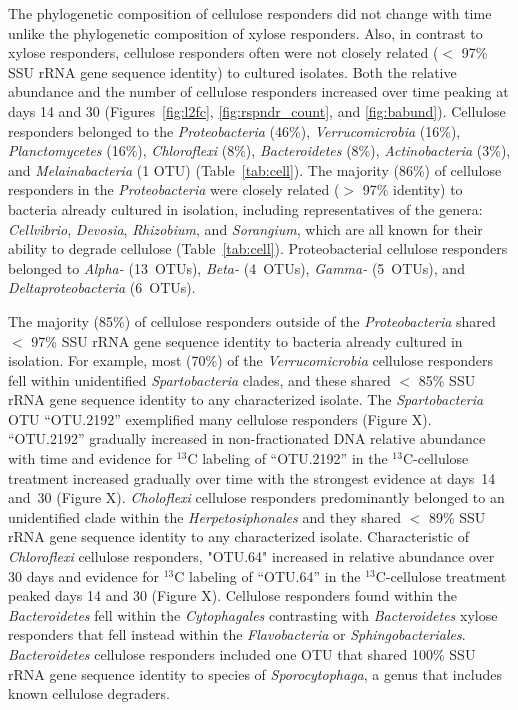 The phylogenetic composition of cellulose responders did not change with time
unlike the phylogenetic composition of xylose responders. Also, in contrast to
xylose responders, cellulose responders often were not closely related ($<$
97\% SSU rRNA gene sequence identity) to cultured isolates. Both the relative
abundance and the number of cellulose responders increased over time peaking at
days 14 and 30 (Figures~\ref{fig:l2fc}, \ref{fig:rspndr_count}, and
\ref{fig:babund}). Cellulose responders belonged to the \textit{Proteobacteria}
(46\%), \textit{Verrucomicrobia} (16\%), \textit{Planctomycetes} (16\%),
\textit{Chloroflexi} (8\%), \textit{Bacteroidetes} (8\%),
\textit{Actinobacteria} (3\%), and \textit{Melainabacteria} (1 OTU)
(Table~\ref{tab:cell}). The majority (86\%) of cellulose responders in the
\textit{Proteobacteria} were closely related ($>$ 97\% identity) to bacteria
already cultured in isolation, including representatives of the genera:
\textit{Cellvibrio}, \textit{Devosia}, \textit{Rhizobium}, and
\textit{Sorangium}, which are all known for their ability to degrade cellulose
(Table~\ref{tab:cell}). Proteobacterial cellulose responders belonged to
\textit{Alpha-} (13~OTUs), \textit{Beta-} (4~OTUs), \textit{Gamma-} (5~OTUs),
and \textit{Deltaproteobacteria} (6~OTUs). 

The majority (85\%) of cellulose responders outside of the
\textit{Proteobacteria} shared  $<$ 97\% SSU rRNA gene sequence identity to
bacteria already cultured in isolation. For example, most (70\%) of the
\textit{Verrucomicrobia} cellulose responders fell within unidentified
\textit{Spartobacteria} clades, and these shared $<$ 85\% SSU rRNA gene
sequence identity to any characterized isolate. The \textit{Spartobacteria} OTU
``OTU.2192'' exemplified many cellulose responders (Figure X). ``OTU.2192''
gradually increased in non-fractionated DNA relative abundance with time and
evidence for $^{13}$C labeling of ``OTU.2192'' in the $^{13}$C-cellulose
treatment increased gradually over time with the strongest evidence at days~14
and~30 (Figure X). \textit{Choloflexi} cellulose responders predominantly
belonged to an unidentified clade within the \textit{Herpetosiphonales} and
they shared $<$ 89\% SSU rRNA gene sequence identity to any characterized
isolate. Characteristic of \textit{Chloroflexi} cellulose responders,
"OTU.64" increased in relative abundance over 30 days and evidence for $^{13}$C
labeling of ``OTU.64'' in the $^{13}$C-cellulose treatment peaked days 14 and
30 (Figure X). Cellulose responders found within the \textit{Bacteroidetes}
fell within the \textit{Cytophagales} contrasting with \textit{Bacteroidetes}
xylose responders that fell instead within the \textit{Flavobacteria} or
\textit{Sphingobacteriales}. \textit{Bacteroidetes} cellulose responders
included one OTU that shared 100\% SSU rRNA gene sequence identity to species
of \textit{Sporocytophaga}, a genus that includes known cellulose degraders.

